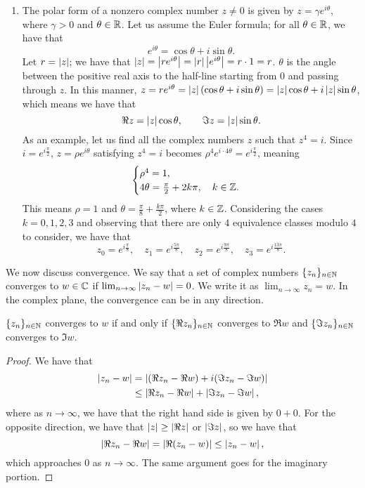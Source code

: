 \begin{enumerate}[label=(\alph*)]
    \item The polar form of a nonzero complex number $z \neq 0$ is given by $z = \gamma e^{i \theta}$, where $\gamma > 0$ and $\theta \in \mathbb R$. Let us assume the Euler formula; for all $\theta \in \mathbb R$, we have that
    \[ e^{i \theta} = \cos \theta + i \sin \theta. \]
    Let $r = \left\lvert z \right\rvert$; we have that $\left\lvert z \right\rvert = \left\lvert r e^{i \theta} \right\rvert = \left\lvert r \right\rvert \left\lvert e^{i \theta} \right\rvert = r \cdot 1 = r$. $\theta$ is the angle between the positive real axis to the half-line starting from $0$ and passing through $z$. In this manner, $z = r e^{i \theta} = \left\lvert z \right\rvert (\cos \theta + i \sin \theta) =  \left\lvert z \right\rvert \cos \theta + i \left\lvert z \right\rvert \sin \theta$, which means we have that
    \[ \Re z = \left\lvert z \right\rvert \cos \theta, \qquad \Im z = \left\lvert z \right\rvert \sin \theta. \]
    As an example, let us find all the complex numbers $z$ such that $z^4 = i$. Since $i = e^{i \frac{\pi}{2}}$, $z = \rho e^{i \theta}$ satisfying $z^4 = i$ becomes $\rho^4 e^{i \cdot 4 \theta} = e^{i \frac{\pi}{2}}$, meaning
    \[ \begin{cases} \rho^4 = 1, \\ 4 \theta = \frac{\pi}{2} + 2k \pi, \quad k \in \mathbb Z. \end{cases} \]
    This means $\rho = 1$ and $\theta = \frac{\pi}{8} + \frac{k\pi}{2}$, where $k \in \mathbb Z$. Considering the cases $k = 0, 1, 2, 3$ and observing that there are only $4$ equivalence classes modulo $4$ to consider, we have that
    \[ z_0 = e^{i \frac{\pi}{8}}, \quad z_1 = e^{i \frac{5 \pi}{8}}, \quad z_2 = e^{i \frac{9 \pi}{8}}, \quad z_3 = e^{i \frac{13 \pi}{8}}. \]
\end{enumerate}
We now discuss convergence. We say that a set of complex numbers $\{z_n\}_{n \in \mathbb N}$ converges to $w \in  \mathbb C$ if $\lim_{n \to \infty} \left\lvert z_n - w \right\rvert = 0$. We write it as $\lim_{n \to \infty} z_n = w$. In the complex plane, the convergence can be in any direction.
\begin{simplelemma}
    $\{z_n\}_{n \in \mathbb N}$ converges to $w$ if and only if $\{\Re z_n\}_{n \in \mathbb N}$ converges to $\Re w$ and $\{\Im z_n\}_{n \in \mathbb N}$ converges to $\Im w$.
\end{simplelemma}
\begin{proof}
    We have that
    \begin{align*}
        \left\lvert z_n - w \right\rvert &= \left\lvert (\Re z_n - \Re w) + i (\Im z_n - \Im w) \right\rvert \\
        &\leq \left\lvert \Re z_n - \Re w \right\rvert + \left\lvert \Im z_n - \Im w \right\rvert,
    \end{align*}
    where as $n \to \infty$, we have that the right hand side is given by $0 + 0$. For the opposite direction, we have that $\left\lvert z \right\rvert \geq \left\lvert \Re z \right\rvert$ or $\left\lvert \Im z \right\rvert$, so we have that
    \[ \left\lvert \Re z_n - \Re w \right\rvert = \left\lvert \Re (z_n - w) \right\rvert \leq \left\lvert z_n - w \right\rvert, \]
    which approaches $0$ as $n \to \infty$. The same argument goes for the imaginary portion.
\end{proof}
